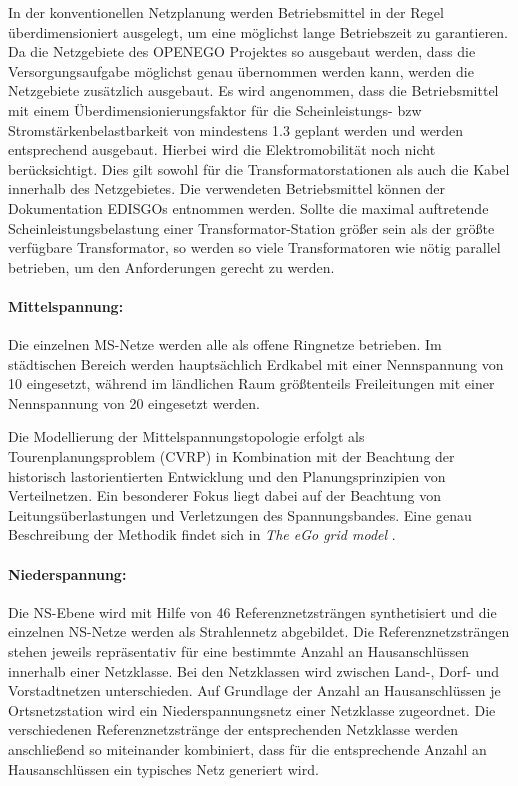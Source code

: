 In der konventionellen Netzplanung werden Betriebsmittel in der Regel überdimensioniert ausgelegt, um eine möglichst lange Betriebszeit zu garantieren.
Da die Netzgebiete des \gls{OPENEGO} Projektes so ausgebaut werden, dass die Versorgungsaufgabe möglichst genau übernommen werden kann, werden die Netzgebiete zusätzlich ausgebaut.
Es wird angenommen, dass die Betriebsmittel mit einem Überdimensionierungsfaktor für die Scheinleistungs- bzw Stromstärkenbelastbarkeit von mindestens \num{1.3} geplant werden und werden entsprechend ausgebaut.
Hierbei wird die Elektromobilität noch nicht berücksichtigt.
Dies gilt sowohl für die Transformatorstationen als auch die Kabel innerhalb des Netzgebietes.
Die verwendeten Betriebsmittel können der Dokumentation \glspl{EDISGO} \cite{edisgoDocs2017a} entnommen werden.
Sollte die maximal auftretende Scheinleistungsbelastung einer Transformator-Station größer sein als der größte verfügbare Transformator, so werden so viele Transformatoren wie nötig parallel betrieben, um den Anforderungen gerecht zu werden.


\paragraph{Mittelspannung:}

Die einzelnen \gls{MS}-Netze werden alle als offene Ringnetze betrieben.
Im städtischen Bereich werden hauptsächlich Erdkabel mit einer Nennspannung von \SI{10}{\kv} eingesetzt, während im ländlichen Raum größtenteils Freileitungen mit einer Nennspannung von \SI{20}{\kv} eingesetzt werden. \cite{Mueller2019}\medskip

Die Modellierung der Mittelspannungstopologie erfolgt als Tourenplanungsproblem (\gls{CVRP}) in Kombination mit der Beachtung der historisch lastorientierten Entwicklung und den Planungsprinzipien von Verteilnetzen.
Ein besonderer Fokus liegt dabei auf der Beachtung von Leitungsüberlastungen und Verletzungen des Spannungsbandes.
Eine genau Beschreibung der Methodik findet sich in \textit{The eGo grid model} \cite{Amme2018}.


\paragraph{Niederspannung:}

Die \gls{NS}-Ebene wird mit Hilfe von \num{46} Referenznetzsträngen synthetisiert und die einzelnen \gls{NS}-Netze werden als Strahlennetz abgebildet.
Die Referenznetzsträngen stehen jeweils repräsentativ für eine bestimmte Anzahl an Hausanschlüssen innerhalb einer Netzklasse.
Bei den Netzklassen wird zwischen Land-, Dorf- und Vorstadtnetzen unterschieden.
Auf Grundlage der Anzahl an Hausanschlüssen je Ortsnetzstation wird ein Niederspannungsnetz einer Netzklasse zugeordnet.
Die verschiedenen Referenznetzstränge der entsprechenden Netzklasse werden anschließend so miteinander kombiniert, dass für die entsprechende Anzahl an Hausanschlüssen ein typisches Netz generiert wird. \cite{Mueller2019}



